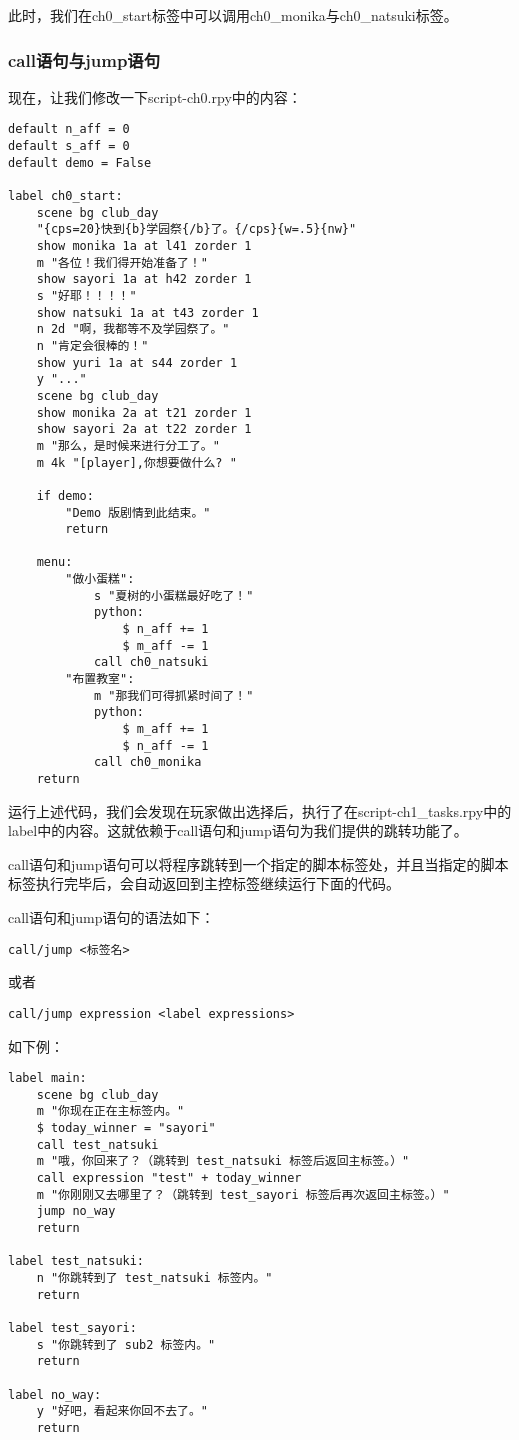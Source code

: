 此时，我们在ch0\_start标签中可以调用ch0\_monika与ch0\_natsuki标签。

\subsubsection{call语句与jump语句}

现在，让我们修改一下script-ch0.rpy中的内容：
\begin{lstlisting}[caption=script-ch0.rpy]
default n_aff = 0
default s_aff = 0
default demo = False

label ch0_start:
    scene bg club_day
    "{cps=20}快到{b}学园祭{/b}了。{/cps}{w=.5}{nw}"
    show monika 1a at l41 zorder 1
    m "各位！我们得开始准备了！"
    show sayori 1a at h42 zorder 1
    s "好耶！！！！"
    show natsuki 1a at t43 zorder 1
    n 2d "啊，我都等不及学园祭了。"
    n "肯定会很棒的！"
    show yuri 1a at s44 zorder 1
    y "..."
    scene bg club_day
    show monika 2a at t21 zorder 1
    show sayori 2a at t22 zorder 1
    m "那么，是时候来进行分工了。"
    m 4k "[player],你想要做什么? "

    if demo:
        "Demo 版剧情到此结束。"
        return

    menu:
        "做小蛋糕":
            s "夏树的小蛋糕最好吃了！"
            python:
                $ n_aff += 1
                $ m_aff -= 1
            call ch0_natsuki
        "布置教室":
            m "那我们可得抓紧时间了！"
            python:
                $ m_aff += 1
                $ n_aff -= 1
            call ch0_monika
    return
\end{lstlisting}

运行上述代码，我们会发现在玩家做出选择后，执行了在script-ch1\_tasks.rpy中的label中的内容。这就依赖于call语句和jump语句为我们提供的跳转功能了。

call语句和jump语句可以将程序跳转到一个指定的脚本标签处，并且当指定的脚本标签执行完毕后，会自动返回到主控标签继续运行下面的代码。

call语句和jump语句的语法如下：
\begin{lstlisting}
call/jump <标签名>
\end{lstlisting}

或者

\begin{lstlisting}
call/jump expression <label expressions>
\end{lstlisting}

如下例：
\begin{lstlisting}
label main:
    scene bg club_day
    m "你现在正在主标签内。"
    $ today_winner = "sayori"
    call test_natsuki
    m "哦，你回来了？（跳转到 test_natsuki 标签后返回主标签。）"
    call expression "test" + today_winner
    m "你刚刚又去哪里了？（跳转到 test_sayori 标签后再次返回主标签。）"
    jump no_way
    return

label test_natsuki:
    n "你跳转到了 test_natsuki 标签内。"
    return

label test_sayori:
    s "你跳转到了 sub2 标签内。"
    return

label no_way:
    y "好吧，看起来你回不去了。"
    return
\end{lstlisting}

